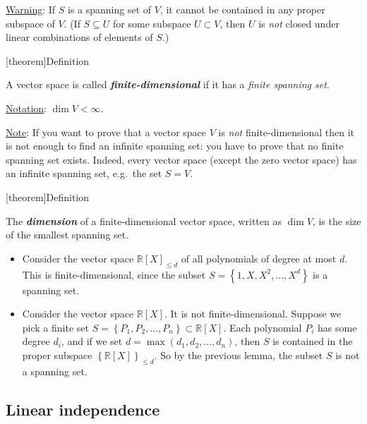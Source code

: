 \documentclass[12pt]{report}
\theoremstyle{definition}
\begin{document}
\underline{Warning}: If $S$ is a spanning set of $V$, it cannot be contained 
in any proper subspace of $V$.
(If $S \subseteq U$ for some subspace $U \subset V$, 
then $U$ is \emph{not} closed under linear combinations of elements of $S$.)

[theorem]{Definition}
\begin{finite spanning set}
    A vector space is called \textbf{\emph{finite-dimensional}} if it has a \emph{finite spanning set}.
\end{finite spanning set}

\underline{Notation}: $\dim{V} < \infty$.

\underline{Note}: If you want to prove that a vector space $V$ is \emph{not} finite-dimensional
then it is not enough to find an infinite spanning set: you have to prove that no finite spanning set exists.
Indeed, every vector space (except the zero vector space) has an infinite spanning set, 
e.g.\ the set $S = V$.

[theorem]{Definition}
\begin{dimension def}
    The \textbf{\emph{dimension}} of a finite-dimensional vector space,
    written as $\dim{V}$,
    is the size of the smallest spanning set.
\end{dimension def}

\begin{ex}
    \begin{itemize}
        \,

            \item 
    Consider the vector space ${\mathbb{R}[X]}_{\le d}$ of all polynomials of degree at most $d$.
    This is finite-dimensional, since the subset $S = \left\{1, X, X^{2},\ldots,X^{d}\right\} $
    is a spanning set.
\item Consider the vector space $\mathbb{R}[X]$. It is not finite-dimensional.
    Suppose we pick a finite set $S = \left\{P_1,P_2,\ldots,P_n\right\} \subset \mathbb{R}[X]$.
    Each polynomial $P_i$ has some degree $d_i$, and if we set $d = \max{(d_1, d_2,\ldots,d_n)}$,
    then $S$ is contained in the proper subspace ${\left\{\mathbb{R}[X]\right\}}_{\le d}$.
    So by the previous lemma, the subset $S$ is not a spanning set.
    \end{itemize}
    
\end{ex}

\subsection{Linear independence}
\end{document}
